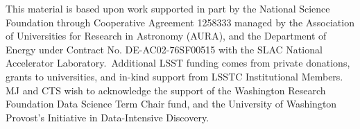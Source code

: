 \documentclass[12pt,preprint]{aastex}
\begin{document}













\acknowledgements
This material is based upon work supported in part by the National Science
Foundation through Cooperative Agreement 1258333 managed by the Association of
Universities for Research in Astronomy (AURA), and the Department of Energy
under Contract No. DE-AC02-76SF00515 with the SLAC National Accelerator
Laboratory. Additional LSST funding comes from private donations, grants to
universities, and in-kind support from LSSTC Institutional Members. MJ and CTS wish to acknowledge the support of the Washington Research Foundation Data Science Term Chair fund, and the University of Washington Provost’s Initiative in Data-Intensive Discovery.

\appendix



\end{document}
